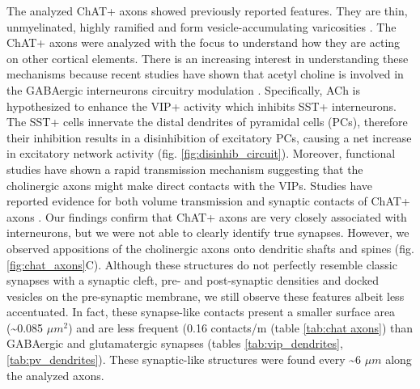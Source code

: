 The analyzed ChAT+ axons showed previously reported features. They are thin, unmyelinated, highly ramified and form vesicle-accumulating varicosities \citep{Descarries2000}. The ChAT+ axons were analyzed with the focus to understand how they are acting on other cortical elements. There is an increasing interest in understanding these mechanisms because recent studies have shown that acetyl choline is involved in the GABAergic interneurons circuitry modulation \citep{Fu2014}. Specifically, ACh is hypothesized to enhance the VIP+ activity which inhibits SST+ interneurons. The SST+ cells innervate the distal dendrites of pyramidal cells (PCs), therefore their inhibition results in a disinhibition of excitatory PCs, causing a net increase in excitatory network activity (fig. \ref{fig:disinhib_circuit}). Moreover, functional studies have shown a rapid transmission mechanism suggesting that the cholinergic axons might make direct contacts with the VIPs. Studies have reported evidence for both volume transmission and synaptic contacts of ChAT+ axons \citep{Sarter2009}. Our findings confirm that ChAT+ axons are very closely associated with interneurons, but we were not able to clearly identify true synapses. However, we observed appositions of the cholinergic axons onto dendritic shafts and spines (fig. \ref{fig:chat_axons}C). Although these structures do not perfectly resemble classic synapses with a synaptic cleft, pre- and post-synaptic densities and docked vesicles on the pre-synaptic membrane, we still observe these features albeit less accentuated. In fact, these synapse-like contacts present a smaller surface area (\textasciitilde 0.085 $\mu m^2$) and are less frequent (0.16 contacts/\textmu m (table \ref{tab:chat axons}) than GABAergic and glutamatergic synapses (tables \ref{tab:vip_dendrites}, \ref{tab:pv_dendrites}). These synaptic-like structures were found every \textasciitilde 6 $\mu m$ along the analyzed axons.

